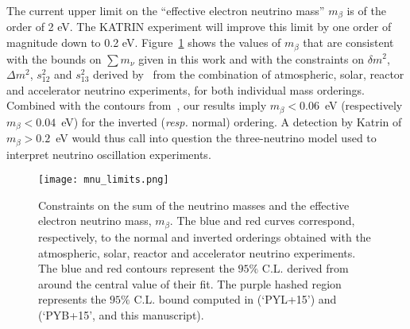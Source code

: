 The current upper limit on the ``effective electron neutrino mass'' $m_\beta$ is of the order of 2 eV. The  KATRIN experiment  will improve this limit by one order of magnitude down to 0.2 eV.  Figure~\ref{fig:ContourNuMass}  shows the values of $m_\beta$ that are consistent with the bounds on   $\sum m_\nu$ given in this work and with the constraints on $\delta m^2$, $\Delta m^2$, $s_{12}^2$ and $s_{13}^2$ derived by~\cite{Capozzi2013csa} from  the combination of atmospheric, solar, reactor and accelerator neutrino experiments, for both individual mass orderings. Combined with the contours from~\cite{Capozzi2013csa}, our results
imply $m_\beta<0.06$~eV  (respectively $m_\beta<0.04$~eV) for the inverted (\textit{resp.} normal) ordering.
A detection by Katrin of $m_\beta>0.2$~eV would thus call into question
the three-neutrino model used to interpret neutrino oscillation experiments. 


\begin{figure}
\begin{center}
\texttt{[image: mnu\_limits.png]}
\caption{Constraints on the sum of the neutrino masses and the effective electron neutrino mass, $m_\beta$. The blue and red curves correspond, respectively, to the normal and inverted orderings obtained with the atmospheric, solar, reactor and accelerator neutrino experiments. The blue and red contours represent the $95\%$ C.L. derived from~\cite{Capozzi2013csa} around the central value of their fit. The purple hashed region represents the $95\%$ C.L. bound computed in \cite{Palanque2015a} (`PYL+15') and \cite{Palanque2015b} (`PYB+15', and this manuscript).}
\label{fig:ContourNuMass}
\end{center}
\end{figure}

